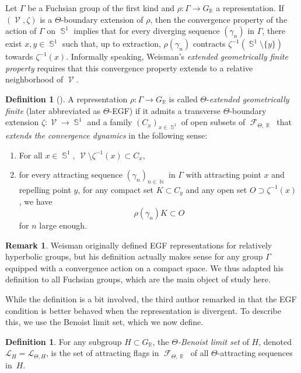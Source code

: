 \documentclass{amsart}
\theoremstyle{plain}
\theoremstyle{definition}
\newtheorem{definition}[proposition]{Definition}
\newtheorem{remark}[proposition]{Remark}
\DeclareMathOperator{\Fc}{\mathcal{F}}
\DeclareMathOperator{\Vc}{\mathcal{V}}
\DeclareMathOperator{\Nb}{{\mathbb{N}}}
\DeclareMathOperator{\Rb}{{\mathbb{R}}}
\DeclareMathOperator{\Sb}{\mathbb{S}}
\newcommand*\from{\colon}
\newcommand{\1}{\mathbf{1}}
\begin{document}
Let $\Gamma$ be a Fuchsian group of the first kind and $\rho\colon \Gamma \to G_{\Rb}$ a representation.
If $(\Vc,\zeta)$ is a $\Theta$-boundary extension of $\rho$, then the convergence property of the action of $\Gamma$ on $\Sb^1$ implies that for every diverging sequence $(\gamma_n)$ in $\Gamma$, there exist $x,y\in \Sb^1$ such that, up to extraction, $\rho(\gamma_n)$ contracts $\zeta^{-1}(\Sb^1\setminus \{y\})$ towards $\zeta^{-1}(x)$.
Informally speaking, Weisman's \emph{extended geometrically finite property} requires that this convergence property extends to a relative neighborhood of $\Vc$.

\begin{definition}[{\cite[Definition 1.3]{Weisman}}]\label{def: EGF}
    A representation $\rho \from \Gamma\to G_{\Rb}$ is called $\Theta$-\emph{extended geometrically finite} (later abbreviated as $\Theta$-EGF) if it admits a transverse $\Theta$-boundary extension $\zeta \from \Vc \to \Sb^1$ and a family $(C_x)_{x\in \Sb^1}$ of open subsets of $\Fc_{\Theta,\Rb}$ that \emph{extends the convergence dynamics} in the following sense:
    \begin{enumerate}
    \item For all $x\in \Sb^1$, $\Vc\setminus \zeta^{-1}(x)\subset C_x$,  
    \item for every attracting sequence $(\gamma_n)_{n\in \Nb}$ in $\Gamma$ with attracting point $x$ and repelling point $y$, for any compact set $K\subset C_y$ and any open set $O\supset \zeta^{-1}(x)$, we have
    \[\rho(\gamma_n)K\subset O\]
    for $n$ large enough.
    \end{enumerate}
\end{definition}

\begin{remark}
    Weisman \cite{Weisman} originally defined EGF representations for relatively hyperbolic groups, but his definition actually makes sense for any group $\Gamma$ equipped with a convergence action on a compact space. We thus adapted his definition to all Fuchsian groups, which are the main object of study here.
\end{remark}

While the definition is a bit involved, the third author remarked in \cite{W23b} that the EGF condition is better behaved when the representation is divergent. To describe this, we use the Benoist limit set, which we now define.

\begin{definition}
For any subgroup $H\subset G_{\Rb}$, the \emph{$\Theta$-Benoist limit set} of $H$, denoted $\mathcal L_H=\mathcal L_{\Theta,H}$, is the set of attracting flags in $\Fc_{\Theta,\Rb}$ of all $\Theta$-attracting sequences in~$H$. 
\end{definition}
\end{document}

